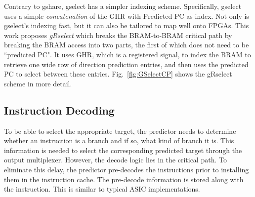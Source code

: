 Contrary to gshare, gselect has a simpler indexing scheme. Specifically, gselect uses a simple \textit{concatenation} of the GHR with Predicted PC as index. Not only is gselect's indexing fast, but it can also  be tailored to map well onto FPGAs. This work proposes \textit{gRselect} which breaks the BRAM-to-BRAM critical path by breaking the BRAM access into two parts, the first of which does not need to be ``predicted PC". It uses GHR, which is a registered signal, to index the BRAM to retrieve one wide row of direction prediction entries, and then uses the predicted PC to select between these entries. Fig.~\ref{fig:GSelectCP} shows the gRselect scheme in more detail.


\subsection{Instruction Decoding}
\label{sec:min:fpga:predecode}
To be able to select the appropriate target, the predictor needs to determine whether an instruction is a branch and if so, what kind of branch it is. This information is needed to select the corresponding predicted target through the output multiplexer. However, the decode logic lies in the critical path. To eliminate this delay, the predictor pre-decodes the instructions prior to installing them in the instruction cache. The pre-decode information is stored along with the instruction. This is similar to  typical ASIC implementations.

 



